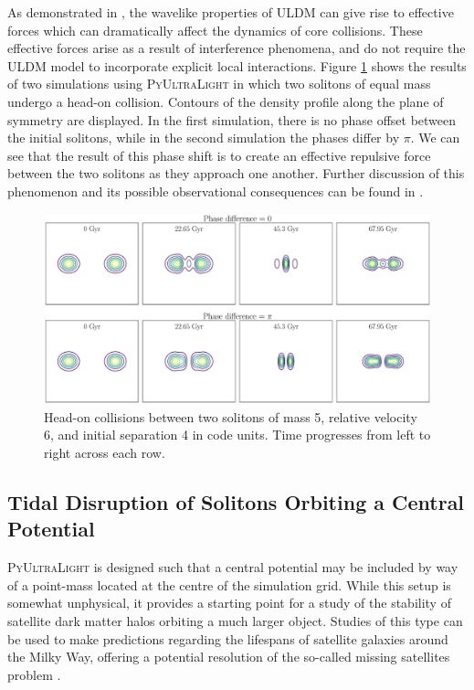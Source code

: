 \documentclass[a4paper,11pt]{article}
\newcommand{\PyUltraLight}{\textsc{PyUltraLight }}
\begin{document}
As demonstrated in \cite{Paredes2016}, the wavelike properties of ULDM can give rise to effective forces which can dramatically affect the dynamics of core collisions. These effective forces arise as a result of interference phenomena, and do not require the ULDM model to incorporate explicit local interactions. Figure \ref{fig:repulsion} shows the results of two simulations using \PyUltraLight in which two solitons of equal mass undergo a head-on collision. Contours of the density profile along the plane of symmetry are displayed. In the first simulation, there is no phase offset between the initial solitons, while in the second simulation the phases differ by $\pi$. We can see that the result of this phase shift is to create an effective repulsive force between the two solitons as they approach one another. Further discussion of this phenomenon and its possible observational consequences can be found in \cite{Paredes2016}.
\begin{figure}
  \includegraphics[width=1.\textwidth, trim={0 0 0 0},clip]{phase_comparison}
  \caption{Head-on collisions between two solitons of mass 5, relative velocity 6, and initial separation 4 in code units. Time progresses from left to right across each row.}
  \label{fig:repulsion}
\end{figure}

\vspace{1em}

\subsection{Tidal Disruption of Solitons Orbiting a Central Potential}\label{sec:disruption}

\PyUltraLight is designed such that a central potential may be included by way of a point-mass located at the centre of the simulation grid. While this setup is somewhat unphysical, it provides a starting point for a study of the stability of satellite dark matter halos orbiting a much larger object. Studies of this type can be used to make predictions regarding the lifespans of satellite galaxies around the Milky Way, offering a potential resolution of the so-called missing satellites problem \cite{Weinberg2015}.
\end{document}
